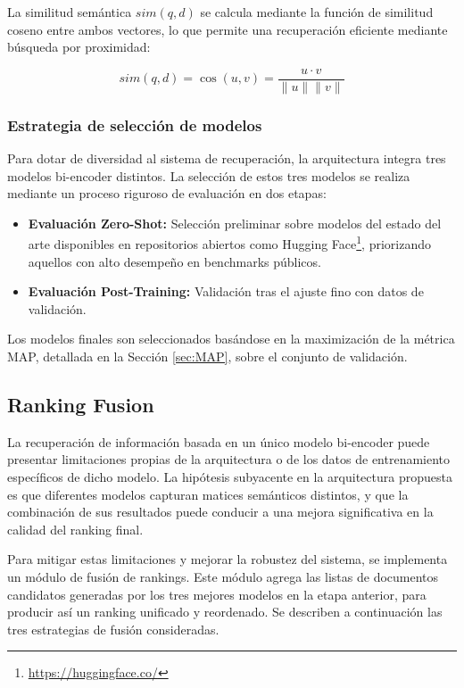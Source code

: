 La similitud semántica $sim(q, d)$ se calcula mediante la función de similitud coseno entre ambos vectores, lo que permite una recuperación eficiente mediante búsqueda por proximidad:

\begin{equation}
    sim(q, d) = \cos(u, v) = \frac{u \cdot v}{\|u\| \|v\|}
\end{equation}

\subsubsection{Estrategia de selección de modelos}

Para dotar de diversidad al sistema de recuperación, la arquitectura integra tres modelos bi-encoder distintos. La selección de estos tres modelos se realiza mediante un proceso riguroso de evaluación en dos etapas:

\begin{itemize}
    \item \textbf{Evaluación Zero-Shot:} Selección preliminar sobre modelos del estado del arte disponibles en repositorios abiertos como Hugging Face\footnote{\url{https://huggingface.co/}}, priorizando aquellos con alto desempeño en benchmarks públicos.
    \item \textbf{Evaluación Post-Training:} Validación tras el ajuste fino con datos de validación.
\end{itemize}

Los modelos finales son seleccionados basándose en la maximización de la métrica \gls{MAP}, detallada en la Sección \ref{sec:MAP}, sobre el conjunto de validación.

\subsection{Ranking Fusion}
\label{sec:Rank_Fusion}

\noindent La recuperación de información basada en un único modelo bi-encoder puede presentar limitaciones propias de la arquitectura o de los datos de entrenamiento específicos de dicho modelo. La hipótesis subyacente en la arquitectura propuesta es que diferentes modelos capturan matices semánticos distintos, y que la combinación de sus resultados puede conducir a una mejora significativa en la calidad del ranking final.

Para mitigar estas limitaciones y mejorar la robustez del sistema, se implementa un módulo de fusión de rankings. Este módulo agrega las listas de documentos candidatos generadas por los tres mejores modelos en la etapa anterior, para producir así un ranking unificado y reordenado. Se describen a continuación las tres estrategias de fusión consideradas.

